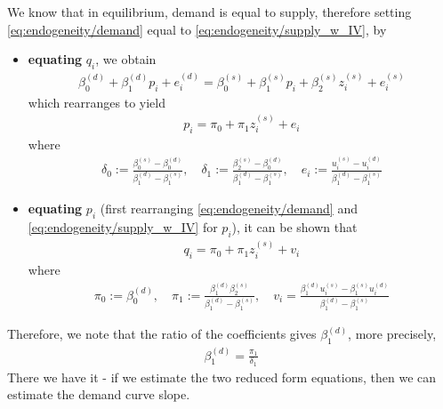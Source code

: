             We know that in equilibrium, demand is equal to supply, therefore setting \eqref{eq:endogeneity/demand} equal to \eqref{eq:endogeneity/supply_w_IV}, by 
            \begin{itemize}
                \item \textbf{equating} $q_i$, we obtain
                \begin{align}
                    \beta_0^{(d)} + \beta_1^{(d)}p_i + e_i^{(d)} = \beta_0^{(s)} + \beta_1^{(s)}p_i + \beta_2^{(s)}z^{(s)}_i + e_i^{(s)}
                \end{align}
                which rearranges to yield
                \begin{align}
                    p_i = \pi_0 + \pi_1 z_i^{(s)} + e_i
                \end{align}
                where
                \begin{align}
                    \delta_0 := \frac{\beta_0^{(s)} - \beta_0^{(d)}}{\beta_1^{(d)} - \beta_1^{(s)}},\quad \delta_1 := \frac{\beta_2^{(s)} - \beta_0^{(d)}}{\beta_1^{(d)} - \beta_1^{(s)}},\quad e_i := \frac{u_i^{(s)}-u_i^{(d)}}{\beta_1^{(d)} - \beta_1^{(s)}}
                \end{align}

                \item \textbf{equating} $p_i$ (first rearranging \eqref{eq:endogeneity/demand} and \eqref{eq:endogeneity/supply_w_IV} for $p_i$), it can be shown that 
                \begin{align}
                    q_i = \pi_0 +\pi_1 z_i^{(s)} + v_i
                \end{align}
                where
                \begin{align}
                    \pi_0 := \beta_0^{(d)},\quad\pi_1 := \frac{\beta_1^{(d)}\beta_2^{(s)}}{\beta_1^{(d)} - \beta_1^{(s)}},\quad v_i = \frac{\beta_1^{(d)}u_i^{(s)} - \beta_1^{(s)}u_i^{(d)}}{\beta_1^{(d)} - \beta_1^{(s)}}
                \end{align}
            \end{itemize}
            Therefore, we note that the ratio of the coefficients gives $\beta_1^{(d)}$, more precisely,
            \begin{align}
                \beta_1^{(d)} = \frac{\pi_1}{\delta_1}
            \end{align}
            There we have it - if we estimate the two reduced form equations, then we can estimate the demand curve slope.
